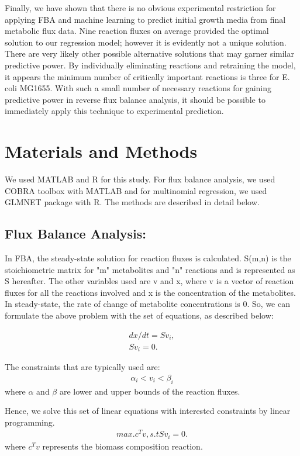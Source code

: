 \documentclass[12pt]{article}
\begin{document}
Finally, we have shown that there is no obvious experimental restriction for applying FBA and machine learning to predict initial growth media from final metabolic flux data. Nine reaction fluxes on average provided the optimal solution to our regression model; however it is evidently not a unique solution. There are very likely other possible alternative solutions that may garner similar predictive power. By individually eliminating reactions and retraining the model, it appears the minimum number of critically important reactions is three for E. coli MG1655.  With such a small number of necessary reactions for gaining predictive power in reverse flux balance analysis, it should be possible to immediately apply this technique to experimental prediction. 

\section*{Materials and Methods}
We used MATLAB and R for this study. For flux balance analysis, we used COBRA toolbox \cite{Schellenbergeretal2011} with MATLAB and for multinomial regression, we used GLMNET package \cite{Friedmanetal2010} with R. The methods are described in detail below.

\subsection*{Flux Balance Analysis:} 
In FBA, the steady-state solution for reaction fluxes is calculated. S(m,n) is the stoichiometric matrix for "m" metabolites and "n" reactions and is represented as S hereafter. The other variables used are v and x, where v is a vector of reaction fluxes for all the reactions involved and x is the concentration of the metabolites. In steady-state, the rate of change of metabolite concentrations is 0. So, we can formulate the above problem with the set of equations, as described below:

\begin{align}
dx/dt = Sv_{i}, \\
Sv_{i}=0.
\end{align}

The constraints that are typically used are: 
\begin{align}
\alpha_{i}<v_{i}<\beta_{i}
\end{align}
where $\alpha$ and $\beta$ are lower and upper bounds of the reaction fluxes.

Hence, we solve this set of linear equations with interested constraints by linear programming.
\begin{align}
{max.} c^Tv, s. t Sv_{i}=0.
\end{align}
where $c^Tv$ represents the biomass composition reaction.
\end{document}
